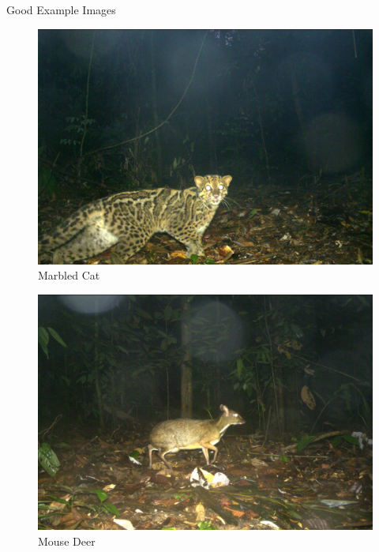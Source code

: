 \documentclass[10pt]{beamer}
\begin{document}
\begin{frame}{Good Example Images}		
	\centering
	\begin{minipage}[c]{0.48\linewidth}
		\begin{figure}
			\includegraphics[width=\linewidth,height=\textheight,keepaspectratio]{images/example_marbled_cat.JPG}
			\caption{Marbled Cat}
		\end{figure}
	\end{minipage}
	\hfill
	\begin{minipage}[c]{0.48\linewidth}
		\begin{figure}
			\includegraphics[width=\linewidth,height=.8\textheight,keepaspectratio]{images/example_mouse_deer.JPG}
			\caption{Mouse Deer}
		\end{figure}
	\end{minipage}
\end{frame}
\end{document}
